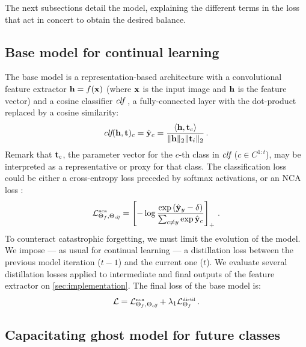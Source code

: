 The next subsections detail the model, explaining the different terms in the loss that act in
concert to obtain the desired balance.

\subsection{Base model for continual learning}
\label{sec:basemodel}

The base model is a representation-based architecture with a convolutional feature extractor $\mathbf{h} =
    f(\mathbf{x})$ (where $\mathbf{x}$ is the input image and $\mathbf{h}$ is the feature vector) and a cosine classifier
$\textit{clf}$ \cite{luo2018cosine_classifier, hou2019ucir}, a fully-connected layer with the dot-product
replaced by a cosine similarity:
%
\begin{equation}
    \textit{clf}(\mathbf{h}, \mathbf{t})_c = \hat{\mathbf{y}}_c = \frac{\langle \mathbf{h}, \mathbf{t}_c \rangle}{\Vert \mathbf{h} \Vert_2 \Vert \mathbf{t}_i \Vert_2}\,.
    \label{eq:cosine-classifier}
\end{equation}
%
Remark that $\mathbf{t}_c$, the parameter vector for the $c$-th class in $\textit{clf}$ ($c\in C^{1:t}$), may be
interpreted as a representative or proxy for that class. The classification loss could be either a
cross-entropy loss preceded by softmax activations, or an NCA loss \cite{goldberger2005nca_loss,
    attias2017proxynca, douillard2020podnet}:
%
\begin{equation}
    \mathcal{L}^{\text{\tiny{nca}}}_{\Theta_f,\Theta_{\textit{clf}}} = \left[- \log\frac{\exp\left(\hat{\mathbf{y}}_y- \delta\right)}{\sum_{c \neq y} \exp \hat{\mathbf{y}}_c} \right]_+ \,.
    \label{eq:nca}
\end{equation}
%
To counteract catastrophic forgetting, we must limit the evolution of the model. We impose — as
usual for continual learning — a distillation loss between the previous model iteration ($t-1$) and
the current one ($t$). We evaluate several distillation losses applied to intermediate and final
outputs of the feature extractor \cite{douillard2020podnet,hou2019ucir} on
\autoref{sec:implementation}. The final loss of the base model is:
%
\begin{equation}
    \mathcal{L} = \mathcal{L}^{\text{\tiny{nca}}}_{\Theta_f,\Theta_{\textit{clf}}} + \lambda_1 \mathcal{L}^\text{\tiny{distil}}_{\Theta_f}\,.
    \label{eq:basemodel_loss}
\end{equation}

\subsection{Capacitating ghost model for future classes}


